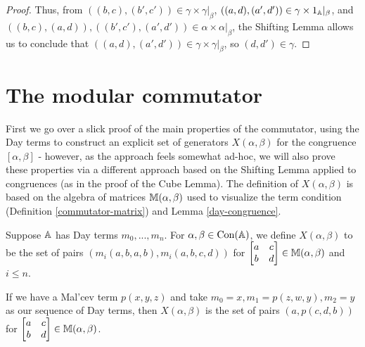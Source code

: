 \begin{appendices}
\begin{proof}
Thus, from $((b,c),(b',c')) \in \gamma \times \gamma|_\beta$, $((a,d),(a',d')) \in \gamma \times 1_{\mathbb{A}}|_\beta$, and $((b,c),(a,d)), ((b',c'),(a',d')) \in \alpha\times\alpha|_\beta$, the Shifting Lemma allows us to conclude that $((a,d),(a',d')) \in \gamma \times \gamma|_\beta$, so $(d,d') \in \gamma$.
\end{proof}


\section{The modular commutator}

First we go over a slick proof of the main properties of the commutator, using the Day terms to construct an explicit set of generators $X(\alpha,\beta)$ for the congruence $[\alpha,\beta]$ - however, as the approach feels somewhat ad-hoc, we will also prove these properties via a different approach based on the Shifting Lemma applied to congruences (as in the proof of the Cube Lemma). The definition of $X(\alpha,\beta)$ is based on the algebra of matrices $\mathbb{M}(\alpha,\beta)$ used to visualize the term condition (Definition \ref{commutator-matrix}) and Lemma \ref{day-congruence}.

\begin{defn} Suppose $\mathbb{A}$ has Day terms $m_0, ..., m_n$. For $\alpha, \beta \in \operatorname{Con}(\mathbb{A})$, we define $X(\alpha,\beta)$ to be the set of pairs $(m_i(a,b,a,b),m_i(a,b,c,d))$ for $\begin{bmatrix} a & c\\ b & d\end{bmatrix} \in \mathbb{M}(\alpha,\beta)$ and $i \le n$.
\end{defn}

\begin{ex} If we have a Mal'cev term $p(x,y,z)$ and take $m_0 = x, m_1 = p(z,w,y), m_2 = y$ as our sequence of Day terms, then $X(\alpha,\beta)$ is the set of pairs $(a,p(c,d,b))$ for $\begin{bmatrix} a & c\\ b & d\end{bmatrix} \in \mathbb{M}(\alpha,\beta)$.
\end{ex}


\end{appendices}
